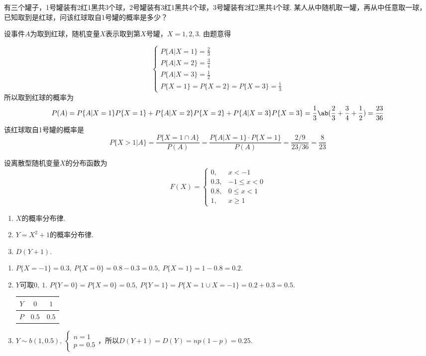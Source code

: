 \begin{problem}
    有三个罐子，1号罐装有2红1黑共3个球，2号罐装有3红1黑共4个球，3号罐装有2红2黑共4个球. 某人从中随机取一罐，再从中任意取一球，已知取到是红球，问该红球取自1号罐的概率是多少？
\end{problem}
\begin{solution}
    设事件$A$为取到红球，随机变量$X$表示取到第$X$号罐，$X=1,2,3$. 由题意得

\[\begin{cases}
    P\{A|X=1\}=\frac23\\
    P\{A|X=2\}=\frac34\\
    P\{A|X=3\}=\frac12\\
    P\{X=1\}=P\{X=2\}=P\{X=3\}=\frac13
\end{cases}\]
所以取到红球的概率为
\[P(A)=P\{A|X=1\}P\{X=1\}+P\{A|X=2\}P\{X=2\}+P\{A|X=3\}P\{X=3\}=\frac13\ab(\frac23+\frac34+\frac12)=\frac{23}{36}\]
该红球取自1号罐的概率是
\[P\{X>1|A\}=\frac{P\{X=1\cap A\}}{P(A)}=\frac{P\{A|X=1\}\cdot P\{X=1\}}{P(A)}=\frac{2/9}{23/36}=\frac{8}{23}\]
\end{solution}

\begin{problem}
    设离散型随机变量$X$的分布函数为
    \[F(X)=\begin{cases}
        0, & x<-1\\
        0.3, & -1\leq x<0\\
        0.8, & 0\leq x<1\\
        1, & x\geq 1
    \end{cases}\]
\begin{enumerate}
    \item $X$的概率分布律.
    \item $Y=X^2+1$的概率分布律.
    \item $D(Y+1)$.
\end{enumerate}
\end{problem}
\begin{solution}
\begin{enumerate}
    \item $P\{X=-1\}=0.3,\ P\{X=0\}=0.8-0.3=0.5,\ P\{X=1\}=1-0.8=0.2$.
    \item $Y$可取$0,\ 1$. $P\{Y=0\}=P\{X=0\}=0.5,\ P\{Y=1\}=P\{X=1\cup X=-1\}=0.2+0.3=0.5$.

\begin{center}
    \begin{tabular}{c|cc}
        \toprule
        $Y$ & $0$ & $1$\\
        \midrule
        $P$ & $0.5$ & $0.5$\\
        \bottomrule
    \end{tabular}
\end{center}
    \item $Y\sim b(1,0.5),\ \begin{cases}
        n=1\\p=0.5
    \end{cases}$，所以$D(Y+1)=D(Y)=np(1-p)=0.25$.
\end{enumerate}
\end{solution}

